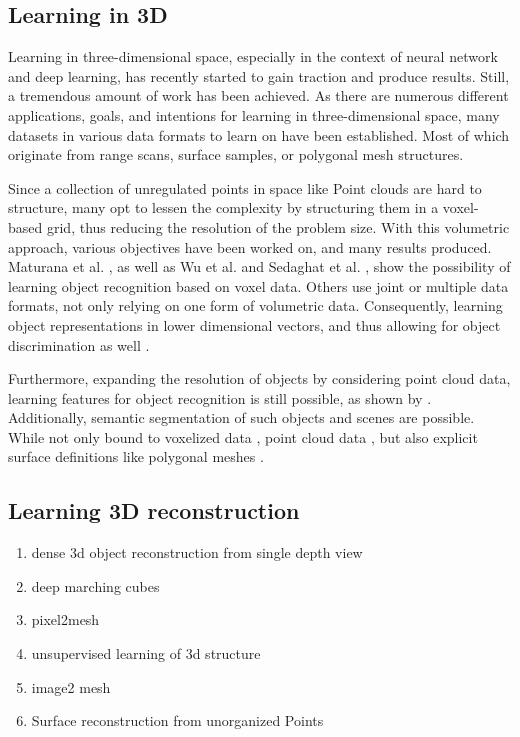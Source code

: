  \subsection{Learning in 3D}
 \label{learn3d}
 Learning in three-dimensional space, especially in the context of neural network and deep learning, has recently
  started to gain traction and produce results. Still, a tremendous amount of work has been achieved. 
 As there are numerous different applications, goals, and intentions for learning in three-dimensional space, many 
 datasets in various data formats to learn on have been established. Most of which originate from range scans, surface samples,
  or polygonal mesh structures. 
 
 Since a collection of unregulated points in space like Point clouds are hard to structure, many opt to lessen the 
 complexity by structuring them in a voxel-based grid, thus reducing the resolution of the problem size.
 With this volumetric approach, various objectives have been worked on, and many results produced. Maturana et al.
  \cite{Maturana2015VoxNet}, as well as Wu et al.\cite{inproceedings} and Sedaghat et al. \cite{SZB17a}, show the possibility of learning object recognition 
  based on voxel data. Others use joint or multiple data formats, not only relying on one form of volumetric data. Consequently, 
  learning object representations in lower dimensional vectors, and thus allowing for object discrimination as well 
  \cite{articlefusionnet,DBLP:journals/corr/QiSNDYG16,DBLP:journals/corr/BrockLRW16}.

  Furthermore, expanding the resolution of objects by considering point cloud data, learning features for object 
  recognition is still possible, as shown by
   \cite{DBLP:journals/corr/QiSMG16,qi2017pointnetplusplus,DBLP:journals/corr/KlokovL17,DBLP:journals/corr/abs-1801-07791,PointGrid}. Additionally,
    semantic segmentation of such objects and 
  scenes are possible. While not only bound to voxelized data \cite{DBLP:journals/corr/abs-1803-10409,DBLP:journals/corr/abs-1712-10215}, point cloud data \cite{DBLP:journals/corr/QiSMG16,qi2017pointnetplusplus,DBLP:journals/corr/DaiCSHFN17,Groh2017,inproceedingsparse,DBLP:journals/corr/abs-1710-07563}, but also explicit surface
   definitions like polygonal meshes \cite{feng2018meshnet,Kalogerakis:2010:labelMeshes,Sidi:2011:UCS:2024156.2024160,Kalogerakis:2017:ShapePFCN}.

 \subsection{Learning 3D reconstruction}
 \label{transform}

 
\begin{enumerate}
  \item dense 3d object reconstruction from single depth view
  \item deep marching cubes
  \item pixel2mesh
  \item unsupervised learning of 3d structure
  \item image2 mesh
  \item Surface reconstruction from unorganized Points
\end{enumerate}
